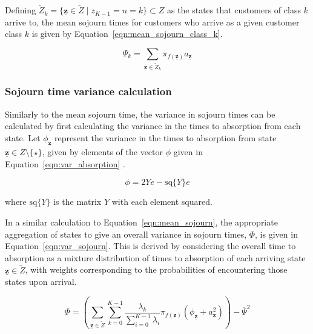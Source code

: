 \documentclass{article}
\begin{document}
Defining $\tilde{Z}_k = \{\underline{\mathbf{z}} \in \tilde{Z} \; | \; z_{K-1} = n = k\} \subset Z$
as the states that customers of class $k$ arrive to, the mean sojourn times for
customers who arrive as a given customer class $k$ is given by
Equation~\ref{eqn:mean_sojourn_class_k}.

\begin{equation}\label{eqn:mean_sojourn_class_k}
\Psi_k = \sum_{\underline{\mathbf{z}} \in \tilde{Z}_k} \pi_{f(\underline{\mathbf{z}})} a_{\underline{\mathbf{z}}}
\end{equation}


\subsubsection{Sojourn time variance calculation}\label{sec:varsojourncalc}
Similarly to the mean sojourn time, the variance in sojourn times can be
calculated by first calculating the variance in the times to absorption from
each state. Let $\phi_{\underline{\mathbf{z}}}$ represent the variance in the
times to absorption from state $\underline{\mathbf{z}} \in Z\setminus\{\star\}$,
given by elements of the vector $\phi$ given in
Equation~\ref{eqn:var_absorption} \cite{stewart09}.

\begin{equation}\label{eqn:var_absorption}
\phi = 2Ye - \text{sq}\{Y\}e
\end{equation}

where $\text{sq}\{Y\}$ is the matrix $Y$ with each element squared.

In a similar calculation to Equation~\ref{eqn:mean_sojourn}, the appropriate
aggregation of states to give an overall variance in sojourn times, $\Phi$, is
given in Equation~\ref{eqn:var_sojourn}. This is derived by considering the
overall time to absorption as a mixture distribution of times to absorption of
each arriving state $\underline{\mathbf{z}} \in \tilde{Z}$, with weights
corresponding to the probabilities of encountering those states upon arrival.

\begin{equation}\label{eqn:var_sojourn}
\Phi = \left(\sum_{\underline{\mathbf{z}} \in \tilde{Z}} \sum_{k=0}^{K-1} \frac{\lambda_k}{\sum_{i=0}^{K-1} \lambda_i} \pi_{f(\underline{\mathbf{z}})} \left(\phi_{\underline{\mathbf{z}}} + a_{\underline{\mathbf{z}}}^2 \right) \right) - \overline{\Psi}^2
\end{equation}
\end{document}
